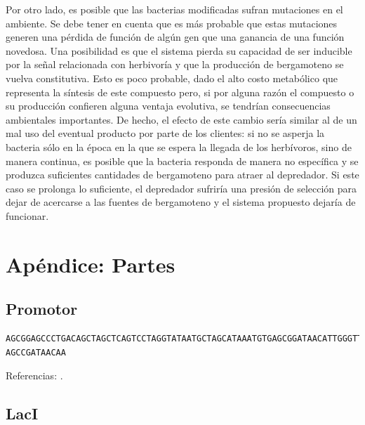 \documentclass[12pt]{article}
\begin{document}
Por otro lado, es posible que las bacterias modificadas sufran mutaciones en el ambiente. Se debe tener en cuenta que es más probable que estas mutaciones generen una pérdida de función de algún gen que una ganancia de una función novedosa. Una posibilidad es que el sistema pierda su capacidad de ser inducible por la señal relacionada con herbivoría y que la producción de bergamoteno se vuelva constitutiva. Esto es poco probable, dado el alto costo metabólico que representa la síntesis de este compuesto pero, si por alguna razón el compuesto o su producción confieren alguna ventaja evolutiva, se tendrían consecuencias ambientales importantes. De hecho, el efecto de este cambio sería similar al de un mal uso del eventual producto por parte de los clientes: si no se asperja la bacteria sólo en la época en la que se espera la llegada de los herbívoros, sino de manera continua, es posible que la bacteria responda de manera no específica y se produzca suficientes cantidades de bergamoteno para atraer al depredador. Si este caso se prolonga lo suficiente, el depredador sufriría una presión de selección para dejar de acercarse a las fuentes de bergamoteno y el sistema propuesto dejaría de funcionar.

\appendix
\section{Ap\'endice: Partes}
\subsection{Promotor}

\begin{verbatim}
AGCGGAGCCCTGACAGCTAGCTCAGTCCTAGGTATAATGCTAGCATAAATGTGAGCGGATAACATTGGGTTTGT
AGCCGATAACAA
\end{verbatim}

Referencias: \cite{hobo99} \cite{lutz97}.

\subsection{LacI}
\end{document}
